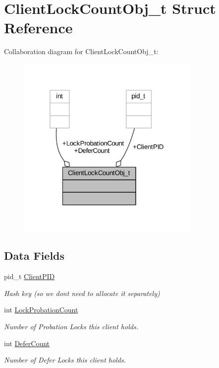 \hypertarget{struct_client_lock_count_obj__t}{}\section{Client\+Lock\+Count\+Obj\+\_\+t Struct Reference}
\label{struct_client_lock_count_obj__t}


Collaboration diagram for Client\+Lock\+Count\+Obj\+\_\+t\+:
\nopagebreak
\begin{figure}[H]
\begin{center}
\leavevmode
\includegraphics[width=253pt]{struct_client_lock_count_obj__t__coll__graph}
\end{center}
\end{figure}
\subsection*{Data Fields}
\begin{DoxyCompactItemize}
\item 
pid\+\_\+t \hyperlink{struct_client_lock_count_obj__t_aa157190d7fb81981e28b66cbfc4f3235}{Client\+P\+ID}
\begin{DoxyCompactList}\small\item\em Hash key (so we don\textquotesingle{}t need to allocate it separately) \end{DoxyCompactList}\item 
int \hyperlink{struct_client_lock_count_obj__t_a7feb37461ed7f0ebdf5a2a7dab02af1c}{Lock\+Probation\+Count}
\begin{DoxyCompactList}\small\item\em Number of Probation Locks this client holds. \end{DoxyCompactList}\item 
int \hyperlink{struct_client_lock_count_obj__t_a4bb0dfb1ade079d3584297e9b185ef68}{Defer\+Count}
\begin{DoxyCompactList}\small\item\em Number of Defer Locks this client holds. \end{DoxyCompactList}\end{DoxyCompactItemize}


